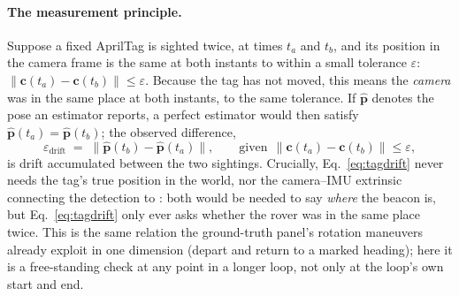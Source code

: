 \paragraph{The measurement principle.} Suppose a fixed AprilTag is sighted
twice, at times $t_a$ and $t_b$, and its position in the camera frame is the
same at both instants to within a small tolerance $\varepsilon$:
$\lVert\mathbf{c}(t_a)-\mathbf{c}(t_b)\rVert \le \varepsilon$. Because the tag
has not moved, this means the \emph{camera} was in the same place at both
instants, to the same tolerance. If $\hat{\mathbf p}$ denotes the pose an
estimator reports, a perfect estimator would then satisfy
$\hat{\mathbf p}(t_a) = \hat{\mathbf p}(t_b)$; the observed difference,
\begin{equation}
\varepsilon_{\text{drift}} \;=\; \bigl\lVert \hat{\mathbf p}(t_b) -
\hat{\mathbf p}(t_a) \bigr\rVert ,
\qquad
\text{given}\ \ \lVert\mathbf{c}(t_a)-\mathbf{c}(t_b)\rVert \le \varepsilon ,
\label{eq:tagdrift}
\end{equation}
is drift accumulated between the two sightings. Crucially, Eq.~\ref{eq:tagdrift}
never needs the tag's true position in the world, nor the camera--IMU
extrinsic connecting the detection to : both would be
needed to say \emph{where} the beacon is, but Eq.~\ref{eq:tagdrift} only ever
asks whether the rover was in the same place twice. This is the same relation
the ground-truth panel's rotation maneuvers already exploit in one dimension
(depart and return to a marked heading); here it is a free-standing check at
any point in a longer loop, not only at the loop's own start and end.
\begin{center}
\end{center}

